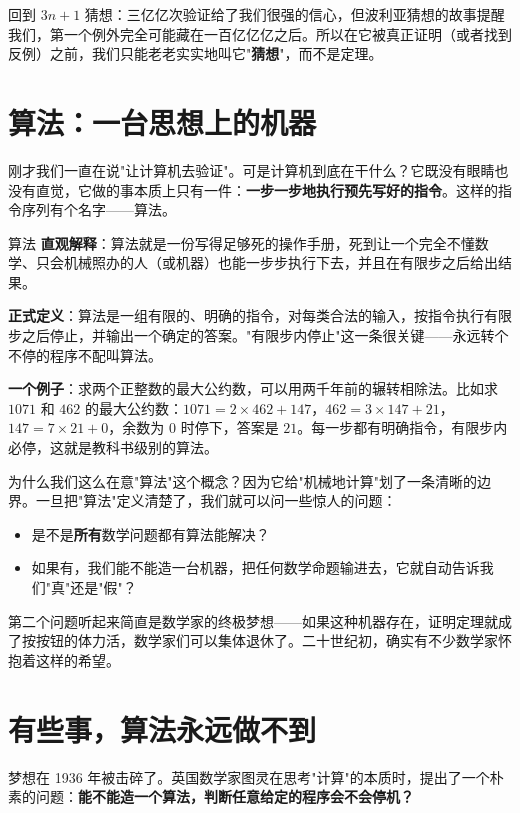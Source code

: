 回到 $3n+1$ 猜想：三亿亿次验证给了我们很强的信心，但波利亚猜想的故事提醒我们，第一个例外完全可能藏在一百亿亿亿之后。所以在它被真正证明（或者找到反例）之前，我们只能老老实实地叫它"\textbf{猜想}"，而不是定理。

\section{算法：一台思想上的机器}

刚才我们一直在说"让计算机去验证"。可是计算机到底在干什么？它既没有眼睛也没有直觉，它做的事本质上只有一件：\textbf{一步一步地执行预先写好的指令}。这样的指令序列有个名字——算法。

\begin{shuyu}{算法}
\textbf{直观解释}：算法就是一份写得足够死的操作手册，死到让一个完全不懂数学、只会机械照办的人（或机器）也能一步步执行下去，并且在有限步之后给出结果。

\textbf{正式定义}：算法是一组有限的、明确的指令，对每类合法的输入，按指令执行有限步之后停止，并输出一个确定的答案。"有限步内停止"这一条很关键——永远转个不停的程序不配叫算法。

\textbf{一个例子}：求两个正整数的最大公约数，可以用两千年前的辗转相除法。比如求 $1071$ 和 $462$ 的最大公约数：$1071 = 2 \times 462 + 147$，$462 = 3 \times 147 + 21$，$147 = 7 \times 21 + 0$，余数为 $0$ 时停下，答案是 $21$。每一步都有明确指令，有限步内必停，这就是教科书级别的算法。
\end{shuyu}

为什么我们这么在意"算法"这个概念？因为它给"机械地计算"划了一条清晰的边界。一旦把"算法"定义清楚了，我们就可以问一些惊人的问题：

\begin{itemize}
\item 是不是\textbf{所有}数学问题都有算法能解决？
\item 如果有，我们能不能造一台机器，把任何数学命题输进去，它就自动告诉我们"真"还是"假"？
\end{itemize}

第二个问题听起来简直是数学家的终极梦想——如果这种机器存在，证明定理就成了按按钮的体力活，数学家们可以集体退休了。二十世纪初，确实有不少数学家怀抱着这样的希望。

\section{有些事，算法永远做不到}

梦想在 1936 年被击碎了。英国数学家图灵在思考"计算"的本质时，提出了一个朴素的问题：\textbf{能不能造一个算法，判断任意给定的程序会不会停机？}

